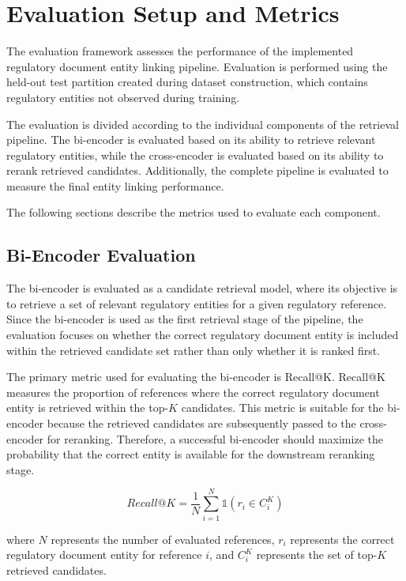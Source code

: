 \section{Evaluation Setup and Metrics}

The evaluation framework assesses the performance of the implemented regulatory document entity linking pipeline. Evaluation is performed using the held-out test partition created during dataset construction, which contains regulatory entities not observed during training.

The evaluation is divided according to the individual components of the retrieval pipeline. The bi-encoder is evaluated based on its ability to retrieve relevant regulatory entities, while the cross-encoder is evaluated based on its ability to rerank retrieved candidates. Additionally, the complete pipeline is evaluated to measure the final entity linking performance.

The following sections describe the metrics used to evaluate each component.

\subsection{Bi-Encoder Evaluation}

The bi-encoder is evaluated as a candidate retrieval model, where its objective is to retrieve a set of relevant regulatory entities for a given regulatory reference. Since the bi-encoder is used as the first retrieval stage of the pipeline, the evaluation focuses on whether the correct regulatory document entity is included within the retrieved candidate set rather than only whether it is ranked first.

The primary metric used for evaluating the bi-encoder is Recall@K. Recall@K measures the proportion of references where the correct regulatory document entity is retrieved within the top-$K$ candidates. This metric is suitable for the bi-encoder because the retrieved candidates are subsequently passed to the cross-encoder for reranking. Therefore, a successful bi-encoder should maximize the probability that the correct entity is available for the downstream reranking stage.

\[
Recall@K = \frac{1}{N}\sum_{i=1}^{N}\mathbb{1}(r_i \in C_i^K)
\]

where $N$ represents the number of evaluated references, $r_i$ represents the correct regulatory document entity for reference $i$, and $C_i^K$ represents the set of top-$K$ retrieved candidates.

